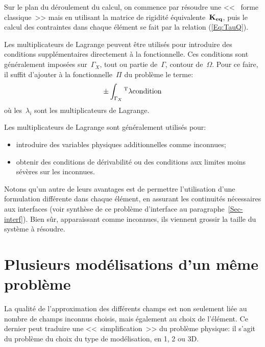 \medskip
Sur le plan du déroulement du calcul, on commence par résoudre une <<~ forme classique~>>
mais en utilisant la matrice de rigidité équivalente~$\MM{K_{eq}}$, puis le
calcul des contraintes dans chaque élément se fait par la relation (\ref{Eq:TauQ}).


\bigskip
Les multiplicateurs de Lagrange
peuvent être utilisés pour introduire
des conditions supplémentaires directement à la fonctionnelle.
Ces conditions sont généralement imposées sur~$\Gamma_X$, tout ou
partie de~$\Gamma$, contour de~$\Omega$.
Pour ce faire, il suffit d'ajouter à la fonctionnelle~$\Pi$
du problème le terme:
\begin{equation}
  \pm\dint_{\Gamma_X} \LL{\lambda}\VV{\text{condition}}
\end{equation}
où les~$\lambda_i$ sont les multiplicateurs de Lagrange.

\medskip
Les multiplicateurs de Lagrange
sont généralement utilisés pour:
\begin{itemize}
  \item introduire des variables physiques additionnelles comme
     inconnues;
  \item obtenir des conditions de dérivabilité ou des conditions aux
     limites moins sévères sur les inconnues.
\end{itemize}

\medskip
Notons qu'un autre de leurs avantages est de permettre l'utilisation d'une formulation différente
dans chaque élément, en assurant les continuités nécessaires aux interfaces (voir synthèse
de ce problème d'interface au paragraphe~\ref{Sec-interf}).
Bien sûr, apparaissant comme inconnues, ils viennent grossir la taille du système à
résoudre.










\medskip
\section{Plusieurs modélisations d'un même problème}\label{Sec-PlusModel}

La qualité de l'approximation des différents champs est non seulement liée
au nombre de champs inconnus choisis, mais également au choix de l'élément.
Ce dernier peut traduire une <<~simplification~>> du problème physique:
il s'agit du problème du choix du type de modélisation, en 1, 2 ou 3D.

